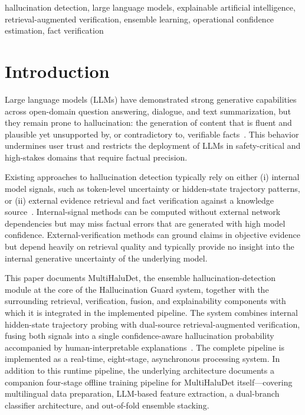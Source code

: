 \documentclass[conference]{IEEEtran}
\begin{document}
\begin{IEEEkeywords}
hallucination detection, large language models, explainable artificial intelligence, retrieval-augmented verification, ensemble learning, operational confidence estimation, fact verification
\end{IEEEkeywords}

\section{Introduction}
Large language models (LLMs) have demonstrated strong generative capabilities across open-domain question answering, dialogue, and text summarization, but they remain prone to hallucination: the generation of content that is fluent and plausible yet unsupported by, or contradictory to, verifiable facts~\cite{li2023halueval, thorne2018fever}. This behavior undermines user trust and restricts the deployment of LLMs in safety-critical and high-stakes domains that require factual precision.

Existing approaches to hallucination detection typically rely on either (i) internal model signals, such as token-level uncertainty or hidden-state trajectory patterns, or (ii) external evidence retrieval and fact verification against a knowledge source~\cite{li2023halueval, thorne2018fever}. Internal-signal methods can be computed without external network dependencies but may miss factual errors that are generated with high model confidence. External-verification methods can ground claims in objective evidence but depend heavily on retrieval quality and typically provide no insight into the internal generative uncertainty of the underlying model.

This paper documents MultiHaluDet, the ensemble hallucination-detection module at the core of the Hallucination Guard system, together with the surrounding retrieval, verification, fusion, and explainability components with which it is integrated in the implemented pipeline. The system combines internal hidden-state trajectory probing with dual-source retrieval-augmented verification, fusing both signals into a single confidence-aware hallucination probability accompanied by human-interpretable explanations~\cite{lundberg2017unified}. The complete pipeline is implemented as a real-time, eight-stage, asynchronous processing system. In addition to this runtime pipeline, the underlying architecture documents a companion four-stage offline training pipeline for MultiHaluDet itself---covering multilingual data preparation, LLM-based feature extraction, a dual-branch classifier architecture, and out-of-fold ensemble stacking.
\end{document}
